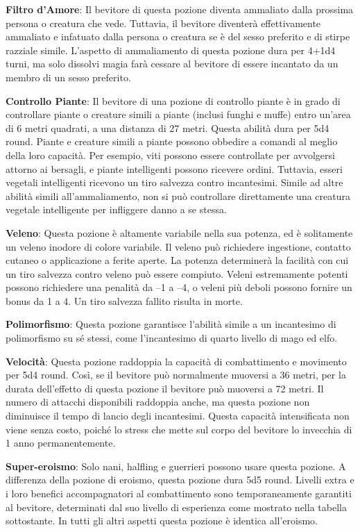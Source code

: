 \documentclass{article}
\begin{document}
\begin{multicols}{2}
\textbf{Filtro d'Amore}: Il bevitore di questa pozione diventa ammaliato dalla prossima persona o creatura che vede. Tuttavia, il bevitore diventerà effettivamente ammaliato e infatuato dalla persona o creatura se è del sesso preferito e di stirpe razziale simile. L'aspetto di ammaliamento di questa pozione dura per 4+1d4 turni, ma solo dissolvi magia farà cessare al bevitore di essere incantato da un membro di un sesso preferito.

\textbf{Controllo Piante}: Il bevitore di una pozione di controllo piante è in grado di controllare piante o creature simili a piante (inclusi funghi e muffe) entro un'area di 6 metri quadrati, a una distanza di 27 metri. Questa abilità dura per 5d4 round. Piante e creature simili a piante possono obbedire a comandi al meglio della loro capacità. Per esempio, viti possono essere controllate per avvolgersi attorno ai bersagli, e piante intelligenti possono ricevere ordini. Tuttavia, esseri vegetali intelligenti ricevono un tiro salvezza contro incantesimi. Simile ad altre abilità simili all'ammaliamento, non si può controllare direttamente una creatura vegetale intelligente per infliggere danno a se stessa.

\textbf{Veleno}: Questa pozione è altamente variabile nella sua potenza, ed è solitamente un veleno inodore di colore variabile. Il veleno può richiedere ingestione, contatto cutaneo o applicazione a ferite aperte. La potenza determinerà la facilità con cui un tiro salvezza contro veleno può essere compiuto. Veleni estremamente potenti possono richiedere una penalità da –1 a –4, o veleni più deboli possono fornire un bonus da 1 a 4. Un tiro salvezza fallito risulta in morte.

\textbf{Polimorfismo}: Questa pozione garantisce l'abilità simile a un incantesimo di polimorfismo su sé stessi, come l'incantesimo di quarto livello di mago ed elfo.

\textbf{Velocità}: Questa pozione raddoppia la capacità di combattimento e movimento per 5d4 round. Così, se il bevitore può normalmente muoversi a 36 metri, per la durata dell'effetto di questa pozione il bevitore può muoversi a 72 metri. Il numero di attacchi disponibili raddoppia anche, ma questa pozione non diminuisce il tempo di lancio degli incantesimi. Questa capacità intensificata non viene senza costo, poiché lo stress che mette sul corpo del bevitore lo invecchia di 1 anno permanentemente.

\textbf{Super-eroismo}: Solo nani, halfling e guerrieri possono usare questa pozione. A differenza della pozione di eroismo, questa pozione dura 5d5 round. Livelli extra e i loro benefici accompagnatori al combattimento sono temporaneamente garantiti al bevitore, determinati dal suo livello di esperienza come mostrato nella tabella sottostante. In tutti gli altri aspetti questa pozione è identica all'eroismo.


\end{multicols}
\end{document}
